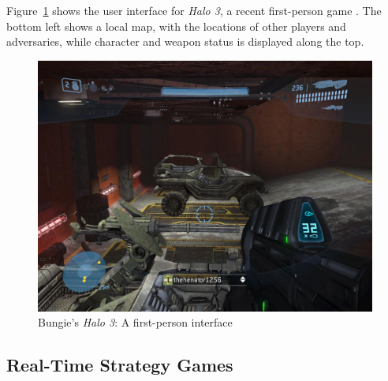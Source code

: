 Figure~\ref{fig:halo3} shows the user interface for \emph{Halo 3}, a recent first-person game \cite{Halo3}. The bottom left shows a local map, with the locations of other players and adversaries, while character and weapon status is displayed along the top. 

\begin{figure}[ht]
\begin{center}
\includegraphics[width=5in]{images/halo3.jpg}
\caption{Bungie's \emph{Halo 3}: A first-person interface \label{fig:halo3}}
\end{center}
\end{figure}


\subsection{Real-Time Strategy Games} %
\label{sub:RTS_games}



